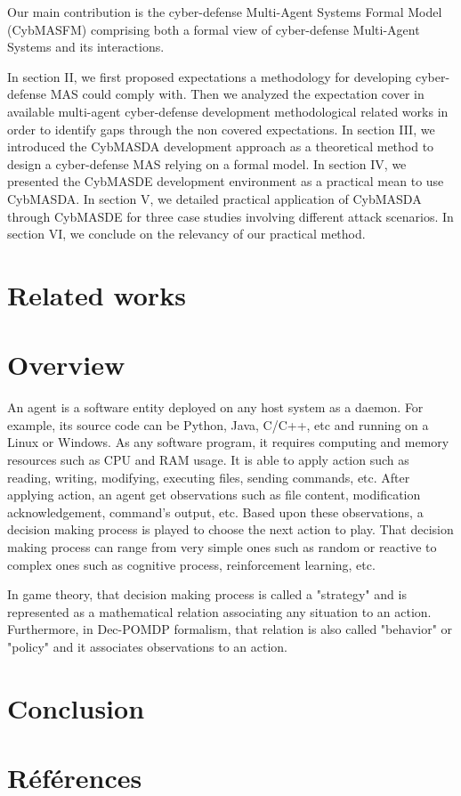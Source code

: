 \documentclass[conference]{IEEEtran}
\begin{document}
Our main contribution is the cyber-defense Multi-Agent Systems Formal Model (CybMASFM) comprising both a formal view of cyber-defense Multi-Agent Systems and its interactions.

In section II, we first proposed expectations a methodology for developing cyber-defense MAS could comply with. Then we analyzed the expectation cover in available multi-agent cyber-defense development methodological related works in order to identify gaps through the non covered expectations.
In section III, we introduced the CybMASDA development approach as a theoretical method to design a cyber-defense MAS relying on a formal model.
In section IV, we presented the CybMASDE development environment as a practical mean to use CybMASDA.
In section V, we detailed practical application of CybMASDA through CybMASDE for three case studies involving different attack scenarios.
In section VI, we conclude on the relevancy of our practical method.


\section{Related works}

\section{Overview}

An agent is a software entity deployed on any host system as a daemon.
For example, its source code can be Python, Java, C/C++, etc and running on a Linux or Windows.
As any software program, it requires computing and memory resources such as CPU and RAM usage.
It is able to apply action such as reading, writing, modifying, executing files, sending commands, etc.
After applying action, an agent get observations such as file content, modification acknowledgement, command's output, etc.
Based upon these observations, a decision making process is played to choose the next action to play. That decision making process can range from very simple ones such as random or reactive to complex ones such as cognitive process, reinforcement learning, etc.

In game theory, that decision making process is called a "strategy" and is represented as a mathematical relation associating any situation to an action.
Furthermore, in Dec-POMDP formalism, that relation is also called "behavior" or "policy" and it associates observations to an action.

\section{Conclusion}


\section*{Références}

% 



\end{document}

